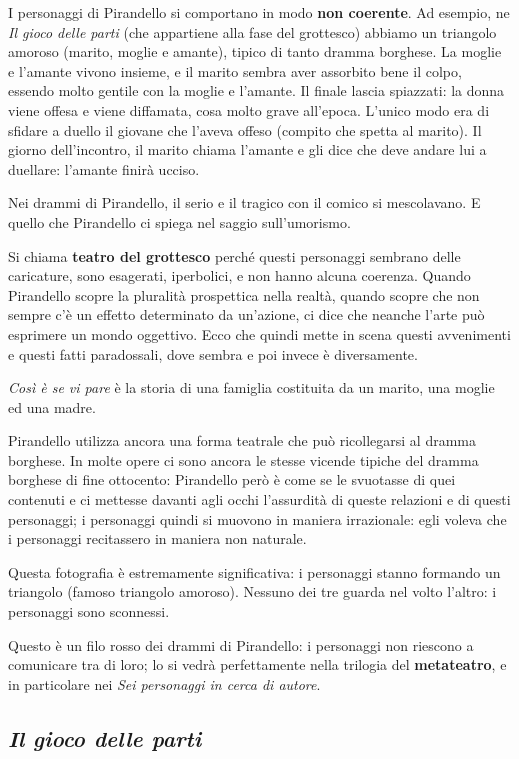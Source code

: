 \documentclass[a4paper, twoside, titlepage]{book}
\begin{document}
I personaggi di Pirandello si comportano in modo \textbf{non coerente}. Ad esempio, ne \textit{Il gioco delle parti} (che appartiene alla fase del grottesco) abbiamo un triangolo amoroso (marito, moglie e amante), tipico di tanto dramma borghese.
La moglie e l’amante vivono insieme, e il marito sembra aver assorbito bene il colpo, essendo molto gentile con la moglie e l’amante.
Il finale lascia spiazzati: la donna viene offesa e viene diffamata, cosa molto grave all’epoca. L’unico modo era di sfidare a duello il giovane che l’aveva offeso (compito che spetta al marito).
Il giorno dell’incontro, il marito chiama l’amante e gli dice che deve andare lui a duellare: l’amante finirà ucciso.

Nei drammi di Pirandello, il serio e il tragico con il comico si mescolavano. E quello che Pirandello ci spiega nel saggio sull’umorismo.

Si chiama \textbf{teatro del grottesco} perché questi personaggi sembrano delle caricature, sono esagerati, iperbolici, e non hanno alcuna coerenza.
Quando Pirandello scopre la pluralità prospettica nella realtà, quando scopre che non sempre c’è un effetto determinato da un’azione, ci dice che neanche l’arte può esprimere un mondo oggettivo.
Ecco che quindi mette in scena questi avvenimenti e questi fatti paradossali, dove sembra e poi invece è diversamente.

\textit{Così è se vi pare} è la storia di una famiglia costituita da un marito, una moglie ed una madre.

Pirandello utilizza ancora una forma teatrale che può ricollegarsi al dramma borghese. 
In molte opere ci sono ancora le stesse vicende tipiche del dramma borghese di fine ottocento: Pirandello però è come se le svuotasse di quei contenuti e ci mettesse davanti agli occhi l’assurdità di queste relazioni e di questi personaggi; i personaggi quindi si muovono in maniera irrazionale: egli voleva che i personaggi recitassero in maniera non naturale.

Questa fotografia è estremamente significativa: i personaggi stanno formando un triangolo (famoso triangolo amoroso). Nessuno dei tre guarda nel volto l’altro: i personaggi sono sconnessi.

Questo è un filo rosso dei drammi di Pirandello: i personaggi non riescono a comunicare tra di loro; lo si vedrà perfettamente nella trilogia del \textbf{metateatro}, e in particolare nei \textit{Sei personaggi in cerca di autore}.

\subsection{\textit{Il gioco delle parti}}
\end{document}
